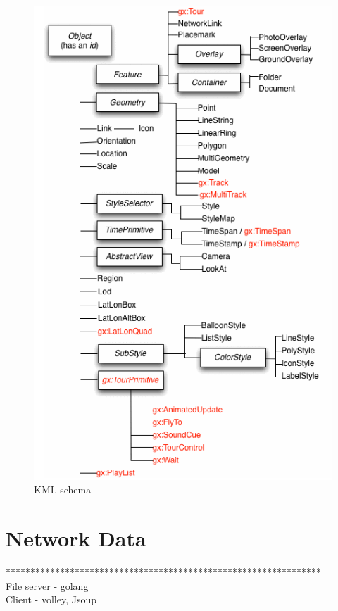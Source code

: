 \begin{figure}[H]
\caption[kml-schema]{KML schema \parencite{Google.kml.2016}}
\label{fig:kml-schema}
\centering
\includegraphics[height=0.5\textheight]{Figures/kml-schema.png}
\decoRule
\end{figure}

\section{Network Data}

****************************************************************\\%
File server - golang\\
Client - volley, Jsoup\\

